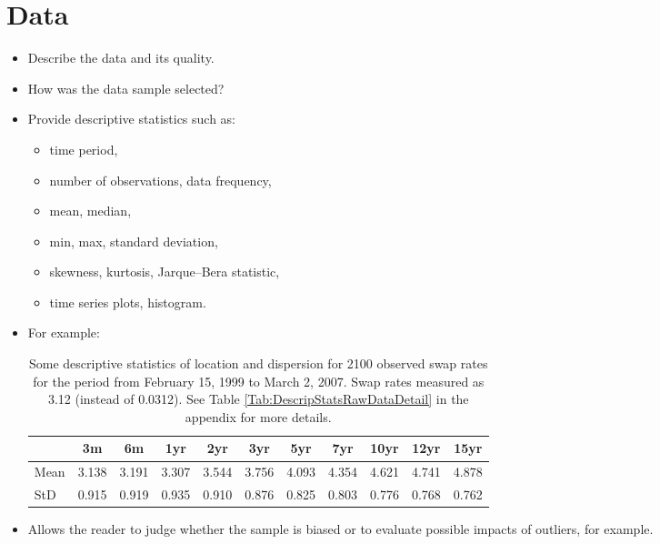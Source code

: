 \section{Data}\label{Sec:Data}

\begin{itemize}

    \item Describe the data and its quality.
    \item How was the data sample selected?
    \item Provide descriptive statistics such as:
        \begin{itemize}
            \item time period,
            \item number of observations, data frequency,
            \item mean, median,
            \item min, max, standard deviation,
            \item skewness, kurtosis, Jarque--Bera statistic,
            \item time series plots, histogram.
        \end{itemize}
    \item For example:
        \begin{table}[ht]

        \begin{center}
            {\footnotesize
            \begin{tabular}{l|cccccccccc}
                \hline \hline
                           & 3m    & 6m    & 1yr   & 2yr   & 3yr   & 5yr   & 7yr   & 10yr  & 12yr  & 15yr   \\
                \hline
                    Mean   & 3.138 & 3.191 & 3.307 & 3.544 & 3.756 & 4.093 & 4.354 & 4.621 & 4.741 & 4.878  \\
                    StD    & 0.915 & 0.919 & 0.935 & 0.910 & 0.876 & 0.825 & 0.803 & 0.776 & 0.768 & 0.762  \\
                \hline \hline
            \end{tabular}}
        \end{center}
        \caption{Some descriptive statistics of location and dispersion for
        2100 observed swap rates for the period from February 15, 1999
        to March 2, 2007. Swap rates measured as 3.12 (instead of 0.0312). See Table
        \ref{Tab:DescripStatsRawDataDetail} in the appendix for
        more details.}
        \label{Tab:DescripStatsRawData}
        \end{table}

    \item Allows the reader to judge whether the sample is biased or to evaluate possible impacts of outliers, for
    example.

\end{itemize}
